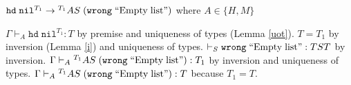 \begin{case}
$\mathtt{hd}\;\mathtt{nil}^{T_{1}}\rightarrow{^{T_{1}}A}S\;(\mathtt{wrong}\;\mathrm{``Empty\;list"})$ where $A\in\lbrace H,M\rbrace$

$\Gamma\vdash_{A}\mathtt{hd}\;\mathtt{nil}^{T_{1}}:T$ by premise and uniqueness of types (Lemma \ref{uot}).  $T=T_{1}$ by inversion (Lemma \ref{i}) and uniqueness of types.  $\vdash_{S}\mathtt{wrong}\;\mathrm{``Empty\;list"}:TST$ by inversion.  $\Gamma\vdash_{A}{^{T_{1}}A}S\;(\mathtt{wrong}\;\mathrm{``Empty\;list"}):T_{1}$ by inversion and uniqueness of types.  $\Gamma\vdash_{A}{^{T_{1}}A}S\;(\mathtt{wrong}\;\mathrm{``Empty\;list"}):T$ because $T_{1}=T$.
\end{case}